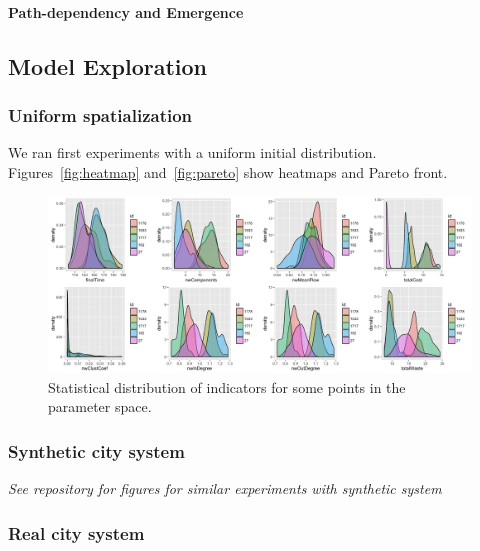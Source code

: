 \documentclass[fleqn,10pt]{wlscirep}
\begin{document}
{\paragraph*{Path-dependency and Emergence}





\subsection*{Model Exploration}


\subsubsection*{Uniform spatialization}

We ran first experiments with a uniform initial distribution. Figures~\ref{fig:heatmap} and~\ref{fig:pareto} show heatmaps and Pareto front.


\begin{figure}
\hspace{-2cm}\includegraphics[width=1.3\textwidth]{figures/indics_distrib.png}
\caption{Statistical distribution of indicators for some points in the parameter space.}
\label{fig:stat-distrib}
\end{figure}



\subsubsection*{Synthetic city system}

\textit{See repository for figures for similar experiments with synthetic system}

\subsubsection*{Real city system}

}
\end{document}
